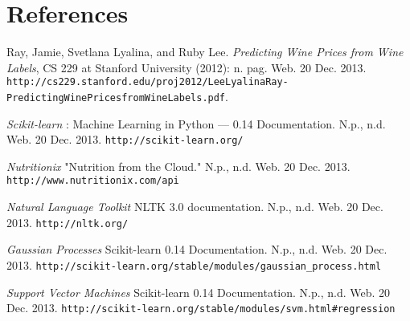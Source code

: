 \documentclass{article}
\begin{document}
\section{References}
\begin{thebibliography}{10}

Ray, Jamie, Svetlana Lyalina, and Ruby Lee.
\emph{Predicting Wine Prices from Wine Labels}, CS 229 at Stanford University (2012): n. pag. Web. 20 Dec. 2013.
\texttt{http://cs229.stanford.edu/proj2012/LeeLyalinaRay-PredictingWinePricesfromWineLabels.pdf}.

\emph{Scikit-learn} : Machine Learning in Python — 0.14 Documentation. N.p., n.d. Web. 20 Dec. 2013. 
\texttt{http://scikit-learn.org/}

 \emph{Nutritionix} "Nutrition from the Cloud." N.p., n.d. Web. 20 Dec. 2013. \texttt{http://www.nutritionix.com/api}

 \emph{Natural Language Toolkit} NLTK 3.0 documentation. N.p., n.d. Web. 20 Dec. 2013. \texttt{http://nltk.org/}

 \emph{Gaussian Processes} Scikit-learn 0.14 Documentation. N.p., n.d. Web. 20 Dec. 2013. \texttt{http://scikit-learn.org/stable/modules/gaussian\_process.html}

 \emph{Support Vector Machines} Scikit-learn 0.14 Documentation. N.p., n.d. Web. 20 Dec. 2013. \texttt{http://scikit-learn.org/stable/modules/svm.html\#regression}

\end{thebibliography}
\end{document}
